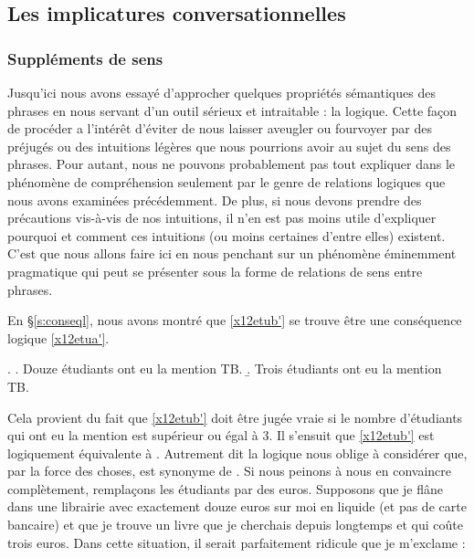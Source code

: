\begin{refsegment}
\newpage










\subsection{Les implicatures conversationnelles}
\label{ss:implicatures}

\subsubsection{Suppléments de sens}

Jusqu'ici 
nous avons essayé d'approcher quelques propriétés sémantiques des
phrases en nous servant d'un outil sérieux et intraitable : la
logique.  Cette façon de procéder a l'intérêt d'éviter de nous
laisser aveugler ou fourvoyer par des préjugés ou des intuitions
légères que nous pourrions avoir au sujet du sens des phrases.  
Pour autant, nous ne pouvons probablement pas tout expliquer dans le phénomène de compréhension seulement par %
 le genre de relations logiques que nous avons
examinées précédemment.  
De plus, si nous devons prendre des précautions vis-à-vis de nos intuitions, il n'en est pas moins utile d'expliquer pourquoi et comment ces intuitions (ou moins certaines d'entre elles) existent.
C'est que nous allons faire ici en nous penchant sur un phénomène éminemment pragmatique qui peut se présenter sous la forme de relations de sens entre phrases.


En \S\ref{s:conseql}, nous avons montré que \ref{x12etub'} se trouve être une conséquence logique \ref{x12etua'}. 


\ex.\label{x12etu'}
\a.  Douze étudiants ont eu la mention TB.\label{x12etua'}
\b. Trois étudiants ont eu la mention TB.\label{x12etub'}

Cela provient du fait que \ref{x12etub'} doit être jugée vraie si le nombre d'étudiants qui ont eu la mention est supérieur ou égal à 3.  Il s'ensuit que \ref{x12etub'} est logiquement équivalente à . Autrement dit la logique nous oblige à considérer que, par la force des choses,  est synonyme de .   
Si nous peinons à nous en convaincre complètement, remplaçons les étudiants par des euros.  
Supposons que je flâne dans une librairie avec exactement douze euros sur moi en liquide (et pas de carte bancaire) et que je trouve un livre que je cherchais depuis longtemps et qui coûte trois euros.  Dans cette situation, il serait parfaitement ridicule que je m'exclame :


\end{refsegment}
